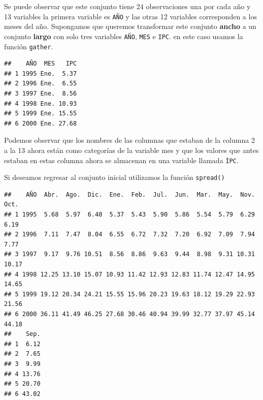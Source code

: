 \documentclass[
]{krantz}
\makeatletter
\newenvironment{Shaded}{\begin{snugshade}}{\end{snugshade}}
\newcommand{\DataTypeTok}[1]{\textcolor[rgb]{0.27,0.27,0.27}{#1}}
\newcommand{\DecValTok}[1]{\textcolor[rgb]{0.06,0.06,0.06}{#1}}
\newcommand{\KeywordTok}[1]{\textcolor[rgb]{0.27,0.27,0.27}{\textbf{#1}}}
\newcommand{\NormalTok}[1]{#1}
\newcommand{\OperatorTok}[1]{\textcolor[rgb]{0.43,0.43,0.43}{\textbf{#1}}}
\newcommand{\StringTok}[1]{\textcolor[rgb]{0.5,0.5,0.5}{#1}}
\newenvironment{kframe}{%
\medskip{}
\setlength{\fboxsep}{.8em}
 \def\at@end@of@kframe{}%
 \ifinner\ifhmode%
  \def\at@end@of@kframe{\end{minipage}}%
  \begin{minipage}{\columnwidth}%
 \fi\fi%
 \def\FrameCommand##1{\hskip\@totalleftmargin \hskip-\fboxsep
 \colorbox{shadecolor}{##1}\hskip-\fboxsep
     \hskip-\linewidth \hskip-\@totalleftmargin \hskip\columnwidth}%
 \MakeFramed {\advance\hsize-\width
   \@totalleftmargin\z@ \linewidth\hsize
   \@setminipage}}%
 {\par\unskip\endMakeFramed%
 \at@end@of@kframe}
\renewenvironment{Shaded}{\begin{kframe}}{\end{kframe}}
\makeatother
\begin{document}
Se puede observar que este conjunto tiene 24 observaciones una por cada año y 13 variables la primera variable es \texttt{AÑO} y las otras 12 variables corresponden a los meses del año. Supongamos que queremos transformar este conjunto \textbf{ancho} a un conjunto \textbf{largo} con solo tres variables \texttt{AÑO}, \texttt{MES} e \texttt{IPC}. en este caso usamos la función \texttt{gather}.

\begin{Shaded}
\end{Shaded}

\begin{verbatim}
##    AÑO  MES   IPC
## 1 1995 Ene.  5.37
## 2 1996 Ene.  6.55
## 3 1997 Ene.  8.56
## 4 1998 Ene. 10.93
## 5 1999 Ene. 15.55
## 6 2000 Ene. 27.68
\end{verbatim}

Podemos observar que los nombres de las columnas que estaban de la columna 2 a la 13 ahora están como categorías de la variable mes y que los valores que antes estaban en estas columna ahora se almacenan en una variable llamada \texttt{ÌPC}.

Si deseamos regresar al conjunto inicial utilizamos la función \texttt{spread()}

\begin{Shaded}
\end{Shaded}

\begin{verbatim}
##    AÑO  Abr.  Ago.  Dic.  Ene.  Feb.  Jul.  Jun.  Mar.  May.  Nov.  Oct.
## 1 1995  5.68  5.97  6.40  5.37  5.43  5.90  5.86  5.54  5.79  6.29  6.19
## 2 1996  7.11  7.47  8.04  6.55  6.72  7.32  7.20  6.92  7.09  7.94  7.77
## 3 1997  9.17  9.76 10.51  8.56  8.86  9.63  9.44  8.98  9.31 10.31 10.17
## 4 1998 12.25 13.10 15.07 10.93 11.42 12.93 12.83 11.74 12.47 14.95 14.65
## 5 1999 19.12 20.34 24.21 15.55 15.96 20.23 19.63 18.12 19.29 22.93 21.56
## 6 2000 36.11 41.49 46.25 27.68 30.46 40.94 39.99 32.77 37.97 45.14 44.18
##    Sep.
## 1  6.12
## 2  7.65
## 3  9.99
## 4 13.76
## 5 20.70
## 6 43.02
\end{verbatim}
\end{document}
